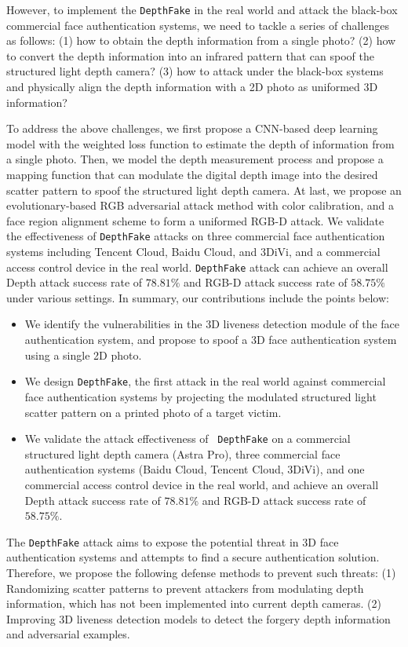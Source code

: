 However, to implement the \texttt{DepthFake} in the real world and attack the black-box commercial face authentication systems, we need to tackle a series of challenges as follows:
(1) how to obtain the depth information from a single photo?
(2) how to convert the depth information into an infrared pattern that can spoof the structured light depth camera?
(3) how to attack under the black-box systems and physically align the depth information with a 2D photo as uniformed 3D information? 


To address the above challenges, we first propose a CNN-based deep learning model with the weighted loss function to estimate the depth of information from a single photo.
Then, we model the depth measurement process and propose a mapping function that can modulate the digital depth image into the desired scatter pattern to spoof the structured light depth camera.
At last, we propose an evolutionary-based RGB adversarial attack method with color calibration, and a face region alignment scheme to form a uniformed RGB-D attack.
We validate the effectiveness of \texttt{DepthFake} attacks on three commercial face authentication systems including Tencent Cloud, Baidu Cloud, and 3DiVi, and a commercial access control device in the real world. \texttt{DepthFake} attack can achieve an overall Depth attack success rate of $78.81\%$ and RGB-D attack success rate of $58.75\%$ under various settings. In summary, our contributions include the points below:
\begin{itemize}	
	\item We identify the vulnerabilities in the 3D liveness detection module of the face authentication system, and propose to spoof a 3D  face authentication system using a single 2D photo.	
	\item We design \texttt{DepthFake},  the first attack in the real world against commercial face authentication systems by projecting the modulated structured light scatter pattern on a printed photo of a target victim.	
	\item We validate the attack effectiveness of  \texttt{DepthFake} on a commercial structured light depth camera (Astra Pro), three commercial face authentication systems (Baidu Cloud, Tencent Cloud, 3DiVi), and one commercial access control device in the real world, and achieve an overall Depth attack success rate of $78.81\%$ and RGB-D attack success rate of $58.75\%$.
\end{itemize}

The \texttt{DepthFake} attack aims to expose the potential threat in 3D face authentication systems and attempts to find a secure authentication solution. Therefore, we propose the following defense methods to prevent such threats:
(1) Randomizing scatter patterns to prevent attackers from modulating depth information, which has not been implemented into current depth cameras.
(2) Improving 3D liveness detection models to detect the forgery depth information and adversarial examples.

